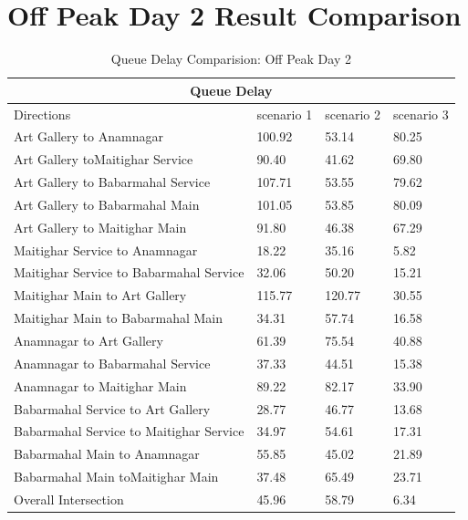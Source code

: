 \clearpage




\section{Off Peak Day 2 Result Comparison}

\begin{table}[h!]
    \centering
    \caption{Queue Delay Comparision: Off Peak Day 2}
    \begin{tabular}{|l|l|l|l|}
         \hline
        \multicolumn{4}{|c|}{\textbf{Queue Delay}} \\
        \hline
        Directions &	scenario 1 &	scenario 2 &	scenario 3 \\
        \hline
        Art Gallery to  Anamnagar	&100.92	&53.14	&80.25 \\
        \hline
        Art Gallery toMaitighar Service&	90.40	&41.62	&69.80 \\
        \hline
        Art Gallery to Babarmahal Service	&107.71	&53.55	&79.62 \\
        \hline
        Art Gallery to Babarmahal Main	&101.05	&53.85	&80.09 \\
        \hline
        Art Gallery to  Maitighar Main&	91.80	&46.38	&67.29 \\
        \hline
        Maitighar Service to  Anamnagar&	18.22&	35.16&	5.82 \\
        \hline
        Maitighar Service to Babarmahal Service&	32.06	&50.20	&15.21 \\
        \hline
        Maitighar Main to  Art Gallery	&115.77	 & 120.77	&30.55 \\
        \hline
        Maitighar Main to Babarmahal Main&	34.31	&57.74	&16.58 \\
        \hline
        Anamnagar to Art Gallery&	61.39	&75.54	&40.88 \\
        \hline
        Anamnagar to  Babarmahal Service&	37.33	&44.51	&15.38 \\
        \hline
        Anamnagar to Maitighar Main&	89.22	&82.17	&33.90 \\
        \hline
        Babarmahal Service to  Art Gallery&	28.77	&46.77	&13.68 \\
        \hline
        Babarmahal Service  to Maitighar Service&	34.97	&54.61	&17.31 \\
        \hline
        Babarmahal Main to  Anamnagar&	55.85	&45.02	&21.89 \\
        \hline
        Babarmahal Main toMaitighar Main&	37.48	&65.49	&23.71 \\
        \hline
        Overall Intersection &	45.96	& 58.79	& 6.34 \\
        \hline

    \end{tabular}

\end{table}

